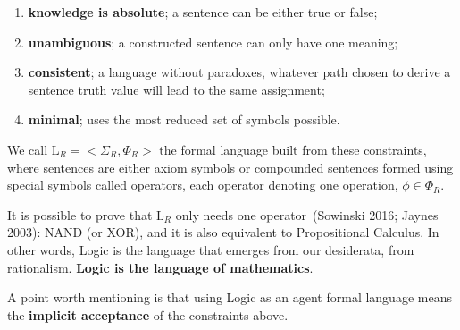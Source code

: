 \documentclass[
  letterpaper,
  12pt,
  british]{tufte-book}
\theoremstyle{plain}
\theoremstyle{definition}
\theoremstyle{plain}
\theoremstyle{remark}
\begin{document}
\begin{enumerate}
\def\labelenumi{\roman{enumi}.}
\item
  \textbf{knowledge is absolute}; a sentence can be either true or false;
\item
  \textbf{unambiguous}; a constructed sentence can only have one
  meaning;
\item
  \textbf{consistent}; a language without paradoxes, whatever path
  chosen to derive a sentence truth value will lead to the same
  assignment;
\item
  \textbf{minimal}; uses the most reduced set of symbols possible.
\end{enumerate}

We call \(\mathrm{L}_R= <\Sigma_R, \Phi_R>\) the formal language built
from these constraints, where sentences are either axiom symbols or
compounded sentences formed using special symbols called operators, each
operator denoting one operation, \(\phi \in \Phi_R\).

It is possible to prove that \(\mathrm{L}_R\) only needs one
operator~(Sowinski 2016; Jaynes
2003):
{NAND} (or {XOR}), and it is also equivalent to Propositional
Calculus. In other words, Logic
is the language that emerges from our desiderata, from rationalism.
\textbf{Logic is the language of mathematics}.

A point worth mentioning is that using Logic as an agent formal language
means the \textbf{implicit acceptance} of the constraints above.
\end{document}
